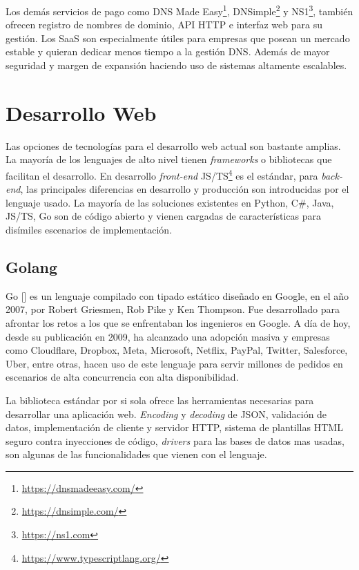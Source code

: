 Los demás servicios de pago como DNS Made Easy\footnote{\url{https://dnsmadeeasy.com/}}, DNSimple\footnote{\url{https://dnsimple.com/}} y NS1\footnote{\url{https://ns1.com}}, también ofrecen registro de nombres de dominio, API HTTP e interfaz web para su gestión. Los SaaS son especialmente útiles para empresas que posean un mercado estable y quieran dedicar menos tiempo a la gestión DNS. Además de mayor seguridad y margen de expansión haciendo uso de sistemas altamente escalables.

\section{Desarrollo Web}

Las opciones de tecnologías para el desarrollo web actual son bastante amplias. La mayoría de los lenguajes de alto nivel tienen \textit{frameworks} o bibliotecas que facilitan el desarrollo. En desarrollo \textit{front-end} JS/TS\footnote{\url{https://www.typescriptlang.org/}} es el estándar, para \textit{back-end}, las principales diferencias en desarrollo y producción son introducidas por el lenguaje usado. La mayoría de las soluciones existentes en Python, C\#, Java, JS/TS, Go son de código abierto y vienen cargadas de características para disímiles escenarios de implementación.

\subsection{Golang}

Go [\cite{go-docs}] es un lenguaje compilado con tipado estático diseñado en Google, en el año 2007, por Robert Griesmen, Rob Pike y Ken Thompson. Fue desarrollado para afrontar los retos a los que se enfrentaban los ingenieros en Google. A día de hoy, desde su publicación en 2009, ha alcanzado una adopción masiva y empresas como Cloudflare, Dropbox, Meta, Microsoft, Netflix, PayPal, Twitter, Salesforce, Uber, entre otras, hacen uso de este lenguaje para servir millones de pedidos en escenarios de alta concurrencia con alta disponibilidad.

La biblioteca estándar por si sola ofrece las herramientas necesarias para desarrollar una aplicación web. \textit{Encoding} y \textit{decoding} de JSON, validación de datos, implementación de cliente y servidor HTTP, sistema de plantillas HTML seguro contra inyecciones de código, \textit{drivers} para las bases de datos mas usadas, son algunas de las funcionalidades que vienen con el lenguaje.

